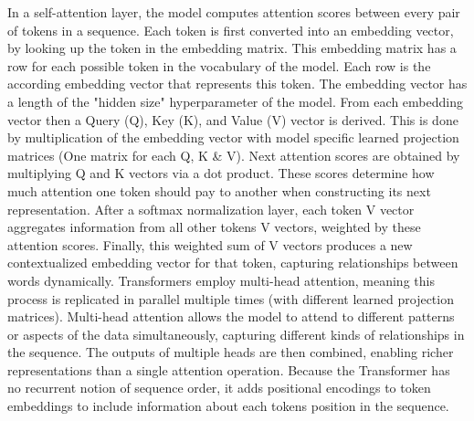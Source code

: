In a self-attention layer, the model computes attention scores between every pair of tokens in a sequence. 
Each token is first converted into an embedding vector, by looking up the token in the embedding matrix.
This embedding matrix has a row for each possible token in the vocabulary of the model.
Each row is the according embedding vector that represents this token. 
The embedding vector has a length of the "hidden size" hyperparameter of the model.
From each embedding vector then a Query (Q), Key (K), and Value (V) vector is derived.
This is done by multiplication of the embedding vector with
model specific learned projection matrices (One matrix for each Q, K \& V).
Next attention scores are obtained by multiplying Q and K vectors via a dot product. 
These scores determine how much attention one token should pay to another when constructing 
its next representation. 
After a softmax normalization layer, each token V vector aggregates information from all 
other tokens V vectors, weighted by these attention scores.
Finally, this weighted sum of V vectors produces a new contextualized embedding vector for that token, 
capturing relationships between words dynamically.
Transformers employ multi-head attention, meaning this process is replicated in parallel multiple times 
(with different learned projection matrices). 
Multi-head attention allows the model to attend to different patterns or aspects of the data simultaneously, 
capturing different kinds of relationships in the sequence. 
The outputs of multiple heads are then combined, 
enabling richer representations than a single attention operation. 
Because the Transformer has no recurrent notion of sequence order, 
it adds positional encodings to token embeddings to include information about each tokens position 
in the sequence.

